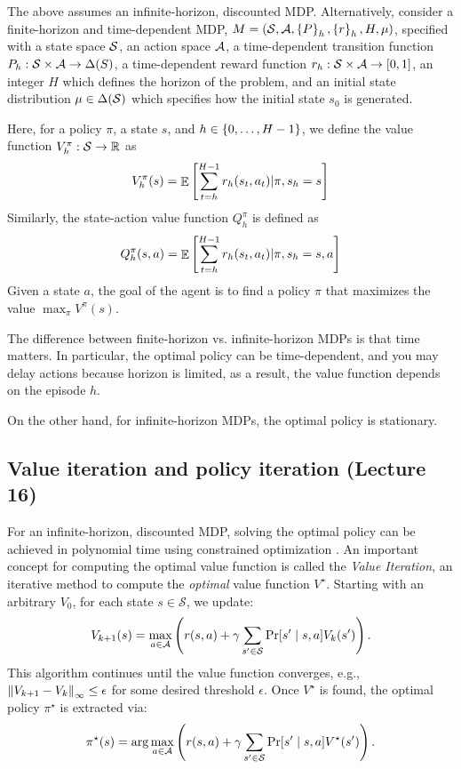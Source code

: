 The above assumes an infinite-horizon, discounted MDP. Alternatively, consider a finite-horizon and time-dependent MDP, $M = (\mathcal{S}, \mathcal{A}, \left\{P\right\}_h, \left\{r\right\}_h, H, \mu)$, specified with a state space $\mathcal{S}$, an action space $\mathcal{A}$, a time-dependent transition function $P_h: \mathcal{S} \times \mathcal{A} \rightarrow \Delta(S)$, a time-dependent reward function $r_h: \mathcal{S} \times \mathcal{A} \rightarrow [0, 1]$, an integer $H$ which defines the horizon of the problem, and an initial state distribution $\mu \in \Delta(\mathcal{S})$ which specifies how the initial state $s_0$ is generated.

Here, for a policy $\pi$, a state $s$, and $h \in \left\{0, \dots, H-1\right\}$, we define the value function $V_h^{\pi}: \mathcal{S} \rightarrow \mathbb{R}$ as
\[ V_h^{\pi}(s) = \mathop{\mathbb{E}}\left[ \sum_{t = h}^{H-1} r_h(s_t, a_t) | \pi, s_h = s  \right] \]
Similarly, the state-action value function $Q_h^{\pi}$ is defined as
\[ Q_h^{\pi}(s, a) = \mathop{\mathbb{E}}\left[ \sum_{t=h}^{H-1} r_h(s_t, a_t) | \pi, s_h = s, a \right] \]
Given a state $a$, the goal of the agent is to find a policy $\pi$ that maximizes the value $\max_\pi V^{\pi}(s)$.

\begin{example}
    The difference between finite-horizon vs. infinite-horizon MDPs is that time matters.
    In particular, the optimal policy can be time-dependent, and you may delay actions because horizon is limited, as a result, the value function depends on the episode $h$.

    On the other hand, for infinite-horizon MDPs, the optimal policy is stationary.
\end{example}

\subsection{Value iteration and policy iteration (Lecture 16)}

For an infinite-horizon, discounted MDP, solving the optimal policy can be achieved in polynomial time using constrained optimization \citep{lan2023policy}.
An important concept for computing the optimal value function is called the \emph{Value Iteration}, an iterative method to compute the \emph{optimal} value function $V^{\star}$.
Starting with an arbitrary $V_0$, for each state $s \in \mathcal{S}$, we update:
\[ V_{k+1}(s) = \max_{a \in \mathcal{A}} \left( r(s, a) + \gamma \sum_{s' \in \mathcal{S}} \Pr[s' \mid s, a ] V_k(s') \right). \]
This algorithm continues until the value function converges, e.g., $\left\| V_{k+1} - V_k \right\|_{\infty} \le \epsilon$ for some desired threshold $\epsilon$.
Once $V^{\star}$ is found, the optimal policy $\pi^{\star}$ is extracted via:
\[ \pi^{\star}(s) = \arg\max_{a \in \mathcal{A}} \left( r(s, a) + \gamma \sum_{s' \in \mathcal{S}} \Pr[s' \mid s, a] V^\star(s') \right). \]

